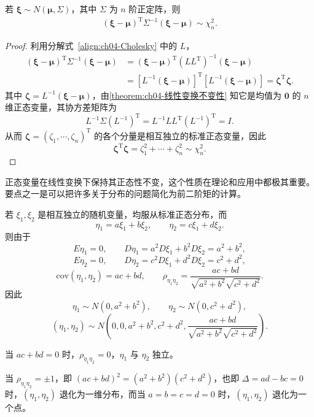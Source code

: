 \documentclass[../../main.tex]{subfiles}
\begin{document}
\begin{corollary}\label{corollary:ch04-Mahalanobis}
若 $\boldsymbol{\xi}\sim N(\boldsymbol{\mu},\Sigma)$，其中 $\Sigma$ 为 $n$ 阶正定阵，则
\begin{align}
(\boldsymbol{\xi}-\boldsymbol{\mu})^{\mathrm{T}}\Sigma^{-1}(\boldsymbol{\xi}-\boldsymbol{\mu})\sim\chi_n^2.\label{align:ch04-Mahalanobis}
\end{align}
\end{corollary}

\begin{proof}
利用分解式~\eqref{align:ch04-Cholesky} 中的 $L$，
\begin{align*}
(\boldsymbol{\xi}-\boldsymbol{\mu})^{\mathrm{T}}\Sigma^{-1}(\boldsymbol{\xi}-\boldsymbol{\mu})
&=(\boldsymbol{\xi}-\boldsymbol{\mu})^{\mathrm{T}}(LL^{\mathrm{T}})^{-1}(\boldsymbol{\xi}-\boldsymbol{\mu})\\
&=[L^{-1}(\boldsymbol{\xi}-\boldsymbol{\mu})]^{\mathrm{T}}[L^{-1}(\boldsymbol{\xi}-\boldsymbol{\mu})]=\boldsymbol{\zeta}^{\mathrm{T}}\boldsymbol{\zeta}.
\end{align*}
其中 $\boldsymbol{\zeta}=L^{-1}(\boldsymbol{\xi}-\boldsymbol{\mu})$，由\cref{theorem:ch04-线性变换不变性} 知它是均值为 $\boldsymbol{0}$ 的 $n$ 维正态变量，其协方差矩阵为
\[
L^{-1}\Sigma(L^{-1})^{\mathrm{T}}=L^{-1}LL^{\mathrm{T}}(L^{-1})^{\mathrm{T}}=I.
\]
从而 $\boldsymbol{\zeta}=(\zeta_1,\cdots,\zeta_n)^{\mathrm{T}}$ 的各个分量是相互独立的标准正态变量，因此
\[
\boldsymbol{\zeta}^{\mathrm{T}}\boldsymbol{\zeta}=\zeta_1^2+\cdots+\zeta_n^2\sim\chi_n^2.
\]
\end{proof}

正态变量在线性变换下保持其正态性不变，这个性质在理论和应用中都极其重要。要点之一是可以把许多关于分布的问题简化为前二阶矩的计算。

\begin{example}[两个标准正态的线性组合]\label{example:ch04-线性组合正态例}
若 $\xi_1,\xi_2$ 是相互独立的随机变量，均服从标准正态分布，而
\[
\eta_1=a\xi_1+b\xi_2,\qquad \eta_2=c\xi_1+d\xi_2.
\]
则由于
\[
E\eta_1=0,\qquad D\eta_1=a^2 D\xi_1+b^2 D\xi_2=a^2+b^2,
\]
\[
E\eta_2=0,\qquad D\eta_2=c^2 D\xi_1+d^2 D\xi_2=c^2+d^2,
\]
\[
\mathrm{cov}(\eta_1,\eta_2)=ac+bd,\qquad
\rho_{\eta_1\eta_2}=\frac{ac+bd}{\sqrt{a^2+b^2}\sqrt{c^2+d^2}}.
\]
因此
\[
\eta_1\sim N(0,a^2+b^2),\qquad \eta_2\sim N(0,c^2+d^2),
\]
\[
(\eta_1,\eta_2)\sim N\left(0,0,a^2+b^2,c^2+d^2,\frac{ac+bd}{\sqrt{a^2+b^2}\sqrt{c^2+d^2}}\right).
\]

当 $ac+bd=0$ 时，$\rho_{\eta_1\eta_2}=0$，$\eta_1$ 与 $\eta_2$ 独立。

当 $\rho_{\eta_1\eta_2}=\pm 1$，即 $(ac+bd)^2=(a^2+b^2)(c^2+d^2)$，也即 $\Delta=ad-bc=0$ 时，$(\eta_1,\eta_2)$ 退化为一维分布，而当 $a=b=c=d=0$ 时，$(\eta_1,\eta_2)$ 退化为一个点。
\end{example}
\end{document}
